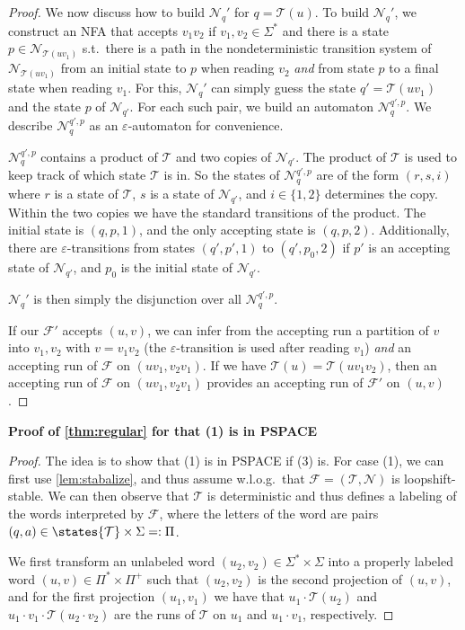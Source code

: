 \documentclass[a4paper,USenglish,cleveref,autoref,thm-restate]{lipics-v2021}
\newcommand{\mc}[1]{\ensuremath{\mathcal{#1}}}
\newcommand{\T}{\mc{T}}
\newcommand{\F}{\mc{F}}
\newcommand{\N}{\mc{N}}
\newcommand{\PSPACE}{\textsf{PSPACE}\xspace}
\begin{document}
{\begin{proof}
    We now discuss how to build $\N_q'$ for $q=\T(u)$.
    To build $\N_q'$, we construct an NFA that accepts $v_1v_2$ if $v_1,v_2 \in \Sigma^*$ and there is a state $p \in \N_{\T(uv_1)}$ s.t.\ there is a path in the nondeterministic transition system of $\N_{\T(uv_1)}$ from an initial state to $p$ when reading $v_2$ \emph{and} from state $p$ to a final state when reading $v_1$.
    For this, $\N_q'$ can simply guess the state $q' = \T(uv_1)$ and the state $p$ of $\N_{q'}$.
    For each such pair, we build an automaton $\N_q^{q',p}$. We describe $\N_q^{q',p}$ as an $\varepsilon$-automaton for convenience.

    $\N_q^{q',p}$ contains a product of $\T$ and two copies of $\N_{q'}$.
    The product of $\T$ is used to keep track of  which state $\T$ is in. So the states of $\N_q^{q',p}$ are of the form $(r,s,i)$ where $r$ is a state of $\T$, $s$ is a state of $\N_{q'}$, and $i \in \{1,2\}$ determines the copy. Within the two copies we have the standard transitions of the product. The initial state is $(q,p,1)$, and the only accepting state is $(q,p,2)$. Additionally, there are $\varepsilon$-transitions from states $(q',p',1)$ to $(q',p_0,2)$ if $p'$ is an accepting state of $\N_{q'}$, and $p_0$ is the initial state of $\N_{q'}$.



    $\N_q'$ is then simply the disjunction over all $\N_q^{q',p}$.

    If our $\F'$ accepts $(u,v)$, we can infer from the accepting run a partition of $v$ into $v_1,v_2$ with $v=v_1v_2$ (the $\varepsilon$-transition is used after reading $v_1$) \emph{and} an accepting run of $\F$ on $(uv_1,v_2v_1)$.
    If we have $\T(u) = \T(uv_1v_2)$, then an accepting run of $\F$ on $(uv_1,v_2v_1)$ provides an accepting run of $\F'$ on $(u,v)$.
\end{proof}

\textbf{Proof of \cref{thm:regular} for that (1) is in \PSPACE}

\begin{proof}
    The idea is to show that (1) is in \PSPACE if (3) is.
    For case (1), we can first use \cref{lem:stabalize}, and thus assume w.l.o.g.\ that $\F=(\T,\N)$ is loopshift-stable.
    We can then observe that $\T$ is deterministic and thus defines a labeling of the words interpreted by $\F$, where the letters of the word are pairs $(q,a) \in \states{\T}\times \Sigma =: \Pi$.

    We first transform an unlabeled word $(u_2,v_2)\in \Sigma^* \times \Sigma$ into a properly labeled word $(u,v) \in \Pi^*\times \Pi^+$ such that $(u_2,v_2)$ is the second projection of $(u,v)$, and for the first projection $(u_1,v_1)$ we have that $u_1\cdot \T(u_2)$ and $u_1\cdot v_1\cdot \T(u_2\cdot v_2)$ are the runs of $\T$ on $u_1$ and $u_1\cdot v_1$, respectively.


\end{proof}}
\end{document}
